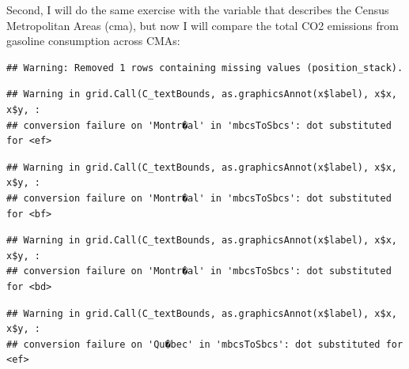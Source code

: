 \documentclass[]{article}
\newenvironment{Shaded}{\begin{snugshade}}{\end{snugshade}}
\newcommand{\DataTypeTok}[1]{\textcolor[rgb]{0.13,0.29,0.53}{#1}}
\newcommand{\FloatTok}[1]{\textcolor[rgb]{0.00,0.00,0.81}{#1}}
\newcommand{\KeywordTok}[1]{\textcolor[rgb]{0.13,0.29,0.53}{\textbf{#1}}}
\newcommand{\NormalTok}[1]{#1}
\newcommand{\OperatorTok}[1]{\textcolor[rgb]{0.81,0.36,0.00}{\textbf{#1}}}
\newcommand{\StringTok}[1]{\textcolor[rgb]{0.31,0.60,0.02}{#1}}
\begin{document}
Second, I will do the same exercise with the variable that describes the
Census Metropolitan Areas (cma), but now I will compare the total CO2
emissions from gasoline consumption across CMAs:

\begin{Shaded}
\end{Shaded}

\begin{verbatim}
## Warning: Removed 1 rows containing missing values (position_stack).
\end{verbatim}

\begin{verbatim}
## Warning in grid.Call(C_textBounds, as.graphicsAnnot(x$label), x$x, x$y, :
## conversion failure on 'Montr�al' in 'mbcsToSbcs': dot substituted for <ef>
\end{verbatim}

\begin{verbatim}
## Warning in grid.Call(C_textBounds, as.graphicsAnnot(x$label), x$x, x$y, :
## conversion failure on 'Montr�al' in 'mbcsToSbcs': dot substituted for <bf>
\end{verbatim}

\begin{verbatim}
## Warning in grid.Call(C_textBounds, as.graphicsAnnot(x$label), x$x, x$y, :
## conversion failure on 'Montr�al' in 'mbcsToSbcs': dot substituted for <bd>
\end{verbatim}

\begin{verbatim}
## Warning in grid.Call(C_textBounds, as.graphicsAnnot(x$label), x$x, x$y, :
## conversion failure on 'Qu�bec' in 'mbcsToSbcs': dot substituted for <ef>
\end{verbatim}
\end{document}
